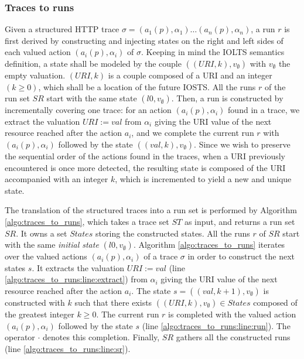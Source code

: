 \subsubsection{Traces to runs}

Given a structured HTTP trace $\sigma = (a_1(p),\alpha_1) \dots
(a_n(p),\alpha_n)$, a run $r$ is first derived by constructing
and injecting states on the right and left sides of
each valued action $(a_i(p),\alpha_i)$ of $\sigma$. Keeping in
mind the IOLTS semantics definition, a state shall be modeled by
the couple $((URI,k),v_\emptyset)$ with $v_\emptyset$ the empty
valuation.  $(URI,k)$ is a couple composed of a URI and an
integer $(k \geq 0)$, which shall be a
location of the future IOSTS. All the runs $r$ of the run set
$SR$ start with the same state $(l0,v_\emptyset)$. Then, a run is
constructed by incrementally covering one trace: for an action
$(a_i(p),\alpha_i)$ found in a trace, we extract the valuation
$URI:=val$ from $\alpha_i$ giving the URI value of the next
resource reached after the action $a_i$, and we complete the
current run $r$ with $(a_i(p),\alpha_i)$ followed by the state
$((val,k),v_\emptyset)$.  Since we wish to preserve the
sequential order of the actions found in the traces, when a URI
previously encountered is once more detected, the resulting state
is composed of the URI accompanied with an integer $k$, which is
incremented to yield a new and unique state.

The translation of the structured traces into a run set is
performed by Algorithm \ref{algo:traces_to_runs}, which takes a
trace set $ST$ as input, and returns a run set $SR$. It owns a
set $States$ storing the constructed states. All the runs $r$ of
$SR$ start with the same \emph{initial state} $(l0,v_\emptyset)$.
Algorithm \ref{algo:traces_to_runs} iterates over the valued actions
$(a_i(p),\alpha_i)$ of a trace $\sigma$ in order to construct the
next states $s$. It extracts the valuation $URI:=val$ (line
\ref{algo:traces_to_runs:line:extract}) from
$\alpha_i$ giving the URI value of the next resource reached
after the action $a_i$. The state $s=((val,k+1),v_\emptyset)$ is
constructed with $k$ such that there exists
$((URI,k),v_\emptyset) \in States$ composed of the greatest
integer $k \geq 0$. The current run $r$ is completed with the
valued action $(a_i(p),\alpha_i)$ followed by the state $s$ (line
\ref{algo:traces_to_runs:line:run}). The operator $\cdot$ denotes
this completion. Finally, $SR$ gathers all the constructed runs
(line \ref{algo:traces_to_runs:line:sr}).

